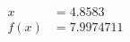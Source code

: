 \documentclass[preview]{standalone}
\begin{document}
\begin{align*}
x &= 4.8583\\f(x) &= 7.9974711
\end{align*}
\end{document}
